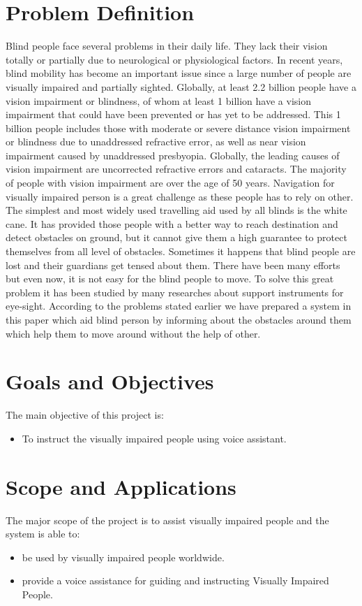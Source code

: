         \section{Problem Definition}
          Blind people face several problems in their daily life. They lack their vision totally or partially due to neurological or physiological factors. In recent years, blind mobility has become an important issue since a large number of people are visually impaired and partially sighted. Globally, at least 2.2 billion people have a vision impairment or blindness, of whom at least 1 billion have a vision impairment that could have been prevented or has yet to be addressed. This 1 billion people includes those with moderate or severe distance vision impairment or blindness due to unaddressed refractive error, as well as near vision impairment caused by unaddressed presbyopia. Globally, the leading causes of vision impairment are uncorrected refractive errors and cataracts. The majority of people with vision impairment are over the age of 50 years. Navigation for visually impaired person is a great challenge as these people has to rely on other. The simplest and most widely used travelling aid used by all blinds is the white cane. It has provided those people with a better way to reach destination and detect obstacles on ground, but it cannot give them a high guarantee to protect themselves from all level of obstacles. Sometimes it happens that blind people are lost and their guardians get tensed about them. There have been many efforts but even now, it is not easy for the blind people to move. To solve this great problem it has been studied by many researches about support instruments for eye-sight. According to the problems stated earlier we have prepared a system in this paper which aid blind person by informing about the obstacles around them which help them to move around without the help of other. 
        \pagebreak
        \section{Goals and Objectives}
            The main objective of this project is:
            \begin{itemize}
                \item To instruct the visually impaired people using voice assistant.
            \end{itemize}
        \section{Scope and Applications}
        The major scope of the project is to assist visually impaired people and the system is able to:
        \begin{itemize}
            \item be used by visually impaired people worldwide.
            \item provide a voice assistance for guiding and instructing Visually Impaired People.
        \end{itemize}
